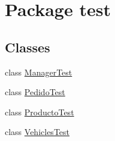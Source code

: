 \hypertarget{namespacetest}{}\section{Package test}
\label{namespacetest}
\subsection*{Classes}
\begin{DoxyCompactItemize}
\item 
class \mbox{\hyperlink{classtest_1_1_manager_test}{Manager\+Test}}
\item 
class \mbox{\hyperlink{classtest_1_1_pedido_test}{Pedido\+Test}}
\item 
class \mbox{\hyperlink{classtest_1_1_producto_test}{Producto\+Test}}
\item 
class \mbox{\hyperlink{classtest_1_1_vehicles_test}{Vehicles\+Test}}
\end{DoxyCompactItemize}
